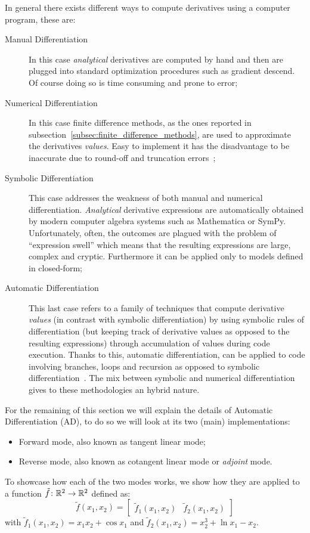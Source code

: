 In general there exists different ways to compute derivatives using a computer program, these are:
\begin{description}
	\item[Manual Differentiation] In this case \emph{analytical} derivatives are computed by hand and then are plugged into standard optimization procedures such as gradient descend. Of course doing so is time consuming and prone to error;
	
	\item[Numerical Differentiation] In this case finite difference methods, as the ones reported in subsection~\vref{subsec:finite_difference_methods}, are used to approximate the derivatives \emph{values}. Easy to implement it has the disadvantage to be inaccurate due to round-off and truncation errors~\cite{LeVeque:FD_book};

	\item[Symbolic Differentiation] This case addresses the weakness of both manual and numerical differentiation. \emph{Analytical} derivative expressions are automatically obtained by modern computer algebra systems such as Mathematica or SymPy. Unfortunately, often, the outcomes are plagued with the problem of ``expression swell'' which means that the resulting expressions are large, complex and cryptic. Furthermore it can be applied only to models defined in closed-form;
	
	\item[Automatic Differentiation] This last case refers to a family of techniques that compute derivative \emph{values} (in contrast with symbolic differentiation) by using symbolic rules of differentiation (but keeping track of derivative values as opposed to the resulting expressions) through accumulation of values during code execution. Thanks to this, automatic differentiation, can be applied to code involving branches, loops and recursion as opposed to symbolic differentiation~\cite{Baydin:AD_survey}. The mix between symbolic and numerical differentiation gives to these methodologies an hybrid nature.
\end{description}

For the remaining of this section we will explain the details of Automatic Differentiation (AD), to do so we will look at its two (main) implementations:
\begin{itemize}
	\item Forward mode, also known as tangent linear mode;
	\item Reverse mode, also known as cotangent linear mode or \emph{adjoint} mode.
\end{itemize}
To showcase how each of the two modes works, we show how they are applied to a function $\tilde{f} \colon \mathbb{R}^2 \to \mathbb{R}^2$ defined as:
\begin{equation}
	\label{eqn:example_function_for_AD}
	\tilde{f}(x_1, x_2) = \begin{bmatrix}
					\tilde{f}_1(x_1, x_2)  &  \tilde{f}_2(x_1, x_2)
				  \end{bmatrix}
\end{equation}
with $\tilde{f}_1(x_1, x_2) = x_1 x_2 + \cos x_1$ and $\tilde{f}_2(x_1, x_2) = x_2^3 + \ln x_1 - x_2$.


